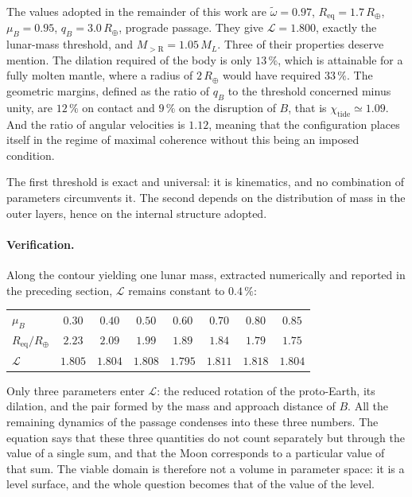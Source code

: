 \documentclass[11pt,a4paper,openany]{report}
\newcommand{\Rt}{R_{\oplus}}
\newcommand{\Req}{R_{\mathrm{eq}}}
\begin{document}
\begin{ideephys}
The values adopted in the remainder of this work are $\tilde\omega=0.97$, $\Req=1.7\,\Rt$,
$\mu_B=0.95$, $q_B=3.0\,\Rt$, prograde passage. They give $\mathcal{L}=1.800$, exactly the
lunar-mass threshold, and $M_{>\mathrm{R}}=1.05\,M_L$. Three of their properties deserve mention.
The dilation required of the body is only $13\,\%$, which is attainable for a fully molten mantle,
where a radius of $2\,\Rt$ would have required $33\,\%$. The geometric margins, defined as the ratio of $q_B$ to the threshold concerned minus unity, are
$12\,\%$ on contact and $9\,\%$ on the disruption of $B$, that is
$\chi_{\mathrm{tide}}\simeq1.09$. And the ratio of angular velocities is
$1.12$, meaning that the configuration places itself in the regime of maximal coherence without
this being an imposed condition.
\end{ideephys}

The first threshold is exact and universal: it is kinematics, and no combination of parameters
circumvents it. The second depends on the distribution of mass in the outer layers, hence on the
internal structure adopted.

\paragraph{Verification.} Along the contour yielding one lunar mass, extracted numerically and
reported in the preceding section, $\mathcal{L}$ remains constant to $0.4\,\%$:

\begin{center}
\begin{tabular}{lccccccc}
\toprule
$\mu_B$ & $0.30$ & $0.40$ & $0.50$ & $0.60$ & $0.70$ & $0.80$ & $0.85$ \\
$\Req/\Rt$ & $2.23$ & $2.09$ & $1.99$ & $1.89$ & $1.84$ & $1.79$ & $1.75$ \\
$\mathcal{L}$ & $1.805$ & $1.804$ & $1.808$ & $1.795$ & $1.811$ & $1.818$ & $1.804$ \\
\bottomrule
\end{tabular}
\end{center}

\begin{ideephys}
Only three parameters enter $\mathcal{L}$: the reduced rotation of the proto-Earth, its dilation,
and the pair formed by the mass and approach distance of $B$. All the remaining dynamics of the
passage condenses into these three numbers. The equation says that these three quantities do not
count separately but through the value of a single sum, and that the Moon corresponds to a
particular value of that sum. The viable domain is therefore not a volume in parameter space: it is
a level surface, and the whole question becomes that of the value of the level.
\end{ideephys}
\end{document}
